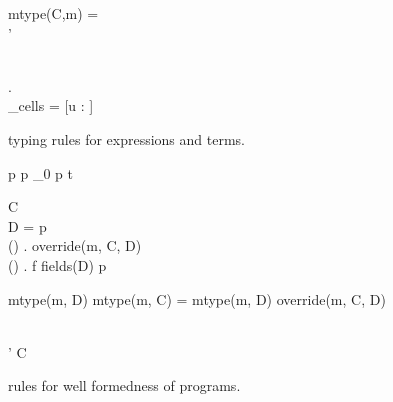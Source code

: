 \begin{figure}[t]
    \vspace{0.5em}

    
    \vspace{0.5em}

    { \andalso mtype(C,m) = \sigma \to \tau \\
     \andalso \sigma' \stof \sigma }
    {}
    
    \vspace{0.5em}

    { \andalso {}}
    {}
    
    \vspace{0.5em}

    { \andalso {} \\
    \forall {} \in {}. \; \\
    \Gamma_{cells} = [u \mapsto \CellType :  \in {}]\\
    }
    {  }

  \caption{\RACL{} typing rules for expressions and terms.}
  \label{fig:expr_typing}
\end{figure}

\begin{figure}
  {p \vdash {} \andalso p \vdash \Gamma_0 \andalso
  }
  {p \vdash {} \:  \: t}

  \RuleSpace{}

  {C \vdash {} \\ D = \AnyRefType{} \lor
  p \vdash {} \\
  \forall () \in {} . \: override(m,
  C, D) \\
  \forall () \in {} . \: f \notin fields(D) }
  {p \vdash {}}

  \RuleSpace{}

  {mtype(m, D) \lor mtype(m, C) = mtype(m, D)}
  {override(m, C, D)}
  
  \RuleSpace{}

  {  \\
  \tau' \stof \tau}
  {C \vdash {}}
  \caption{\RACL{} rules for well formedness of programs.}
  \label{fig:wf_typing}
\end{figure}



